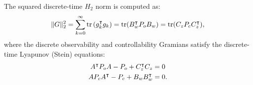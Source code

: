 The squared discrete-time $H_2$ norm is computed as:
\begin{equation}
\| G \|_2^2 = \sum_{k=0}^\infty \operatorname{tr}\left( g_k^\intercal g_k \right) = \operatorname{tr}(B_w^\intercal P_o B_w) = \operatorname{tr}(C_z P_c C_z^\intercal) ,
\end{equation}
where the discrete observability and controllability Gramians satisfy the discrete-time Lyapunov (Stein) equations:
\begin{align}
    A^\intercal P_o A - P_o + C_z^\intercal C_z &= 0 \\
A P_c A^\intercal - P_c + B_w B_w^\intercal &= 0 .
\end{align}


